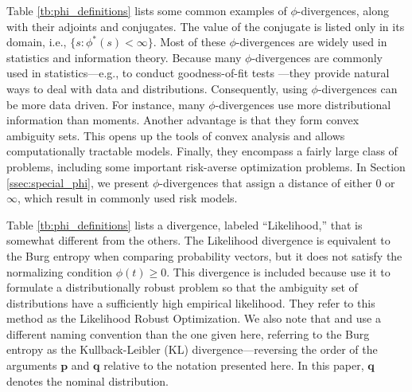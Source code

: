 \documentclass[opre,nonblindrev]{informs3} %
\newcommand{\q}{\mathbf{q}}
\newcommand{\p}{\mathbf{p}}
\newcommand{\plp}{$\phi$LP-2}
\begin{document}
Table \ref{tb:phi_definitions} lists some common examples of $\phi$-divergences, along with their adjoints and conjugates.
The value of the conjugate is listed only in its domain, i.e., $\{s : \phi^*(s) < \infty\}$.
Most of these $\phi$-divergences are widely used in statistics and information theory.
Because many $\phi$-divergences are commonly used in statistics---e.g., to conduct goodness-of-fit tests \citep{pardo2005statistical}---they provide natural ways to deal with data and distributions. 
Consequently, using $\phi$-divergences can be more data driven.
For instance, many $\phi$-divergences use more distributional information than moments.  
Another advantage is that they form convex ambiguity sets.
This opens up the tools of convex analysis and allows computationally tractable models. 
Finally, they encompass a fairly large class of problems, including some important risk-averse optimization problems. 
In Section \ref{ssec:special_phi}, we present $\phi$-divergences that assign a distance of either $0$ or $\infty$, which result in commonly used risk models.

Table \ref{tb:phi_definitions} lists a divergence, labeled ``Likelihood,'' that is somewhat different from the others.
The Likelihood divergence is equivalent to the Burg entropy when comparing probability vectors, but it does not satisfy the normalizing condition $\phi(t) \geq 0$.
This divergence is included because \citet{wang2010likelihood} use it to formulate a distributionally robust problem so that the ambiguity set of distributions have a sufficiently high empirical likelihood. 
They refer to this method as the Likelihood Robust Optimization. 
We also note that \cite{calafiore2007ambiguous} and \cite{hukullback} use a different naming convention than the one given here, referring to the Burg entropy as the Kullback-Leibler (KL) divergence---reversing the order of the arguments $\p$ and $\q$ relative to the notation presented here.
In this paper, $\q$ denotes the  nominal distribution.
\end{document}
